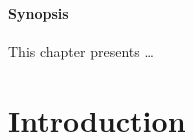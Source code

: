 
\paragraph{Synopsis} This chapter presents …

\section{Introduction}
\label{sec:sota2:intro}
\blindtext